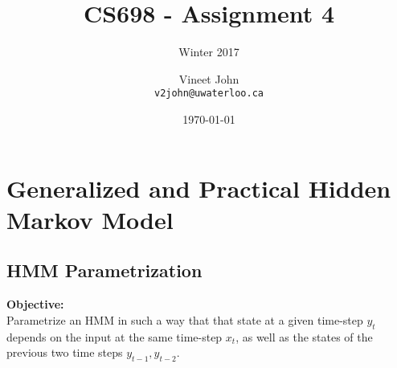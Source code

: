 \documentclass[parskip=half]{scrartcl}
\begin{document}
\title{CS698 - Assignment 4}
\subtitle{Winter 2017}
\author{
    Vineet John\\
    \texttt{v2john@uwaterloo.ca}
}
\date{\today}
\maketitle


\section{Generalized and Practical Hidden Markov Model} %
\label{sec:generalized_and_practical_hidden_markov_model}


    \subsection{HMM Parametrization} %
    \label{sub:hmm_parametrization}

        \textbf{Objective:}\\
        Parametrize an HMM in such a way that that state at a given time-step $y_t$ depends on the input at the same time-step $x_t$, as well as the states of the previous two time steps $y_{t-1}, y_{t-2}$.\\
\end{document}
